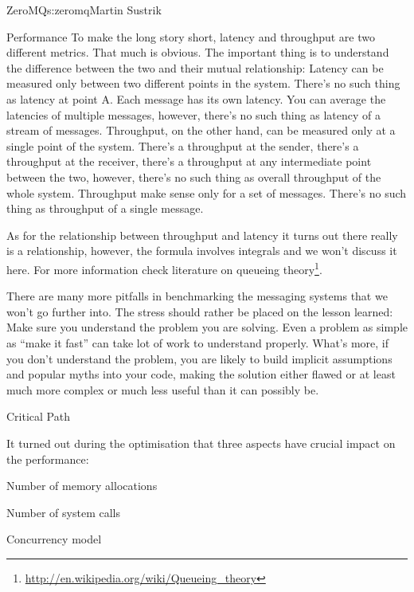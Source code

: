 \begin{aosachapter}{ZeroMQ}{s:zeromq}{Martin Sustrik}
\begin{aosasect1}{Performance}
To make the long story short, latency and throughput are two different
metrics. That much is obvious. The important thing is to understand
the difference between the two and their mutual relationship: Latency
can be measured only between two different points in the
system. There's no such thing as latency at point A. Each message has
its own latency. You can average the latencies of multiple messages,
however, there's no such thing as latency of a stream of
messages. Throughput, on the other hand, can be measured only at a
single point of the system. There's a throughput at the sender,
there's a throughput at the receiver, there's a throughput at any
intermediate point between the two, however, there's no such thing as
overall throughput of the whole system. Throughput make sense only for
a set of messages. There's no such thing as throughput of a single
message.

As for the relationship between throughput and latency it turns out
there really is a relationship, however, the formula involves
integrals and we won't discuss it here. For more information check
literature on queueing
theory\footnote{\url{http://en.wikipedia.org/wiki/Queueing_theory}}.

There are many more pitfalls in benchmarking the messaging systems
that we won't go further into. The stress should rather be placed on
the lesson learned: Make sure you understand the problem you are
solving. Even a problem as simple as ``make it fast'' can take lot of
work to understand properly. What's more, if you don't understand the
problem, you are likely to build implicit assumptions and popular
myths into your code, making the solution either flawed or at least
much more complex or much less useful than it can possibly be.

\end{aosasect1}

\begin{aosasect1}{Critical Path}

It turned out during the optimisation that three aspects have crucial
impact on the performance:

\begin{aosaitemize}

\item Number of memory allocations

\item Number of system calls

\item Concurrency model


\end{aosaitemize}
\end{aosasect1}
\end{aosachapter}

